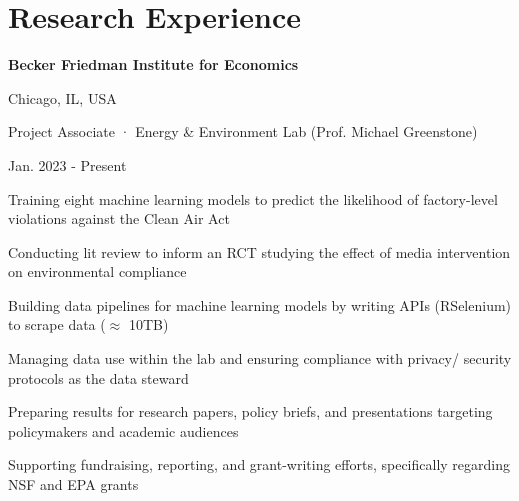 \documentclass[a4paper,20pt]{article}
\begin{document}
\vspace{0pt}
\section{Research Experience}
    \begin{minipage}{.75\linewidth} \begin{flushleft}
    		\textbf{Becker Friedman Institute for Economics}
    	\end{flushleft} \end{minipage}
    \hfill 
    \begin{minipage}{.20\linewidth}\begin{flushright}
    	 Chicago, IL, USA
    	\end{flushright}\end{minipage}
     
    \begin{minipage}{.75\linewidth} \begin{flushleft}
    		Project Associate · Energy \& Environment Lab (Prof. Michael Greenstone)
    	\end{flushleft} \end{minipage}
    \hfill 
    \begin{minipage}{.20\linewidth}\begin{flushright}
    	 Jan. 2023 - Present
    	\end{flushright}\end{minipage}
        \vspace{-5pt}
	\begin{description}[font=$\bullet$]
	\item{Training eight machine learning models to predict the likelihood of factory-level violations against the Clean Air Act}
        \vspace{-7pt}
        \item{Conducting lit review to inform an RCT studying the effect of media intervention on environmental compliance}
        \vspace{-7pt}
        \item{Building data pipelines for machine learning models by writing APIs (RSelenium) to scrape data ($\approx$ 10TB)} 
        \vspace{-7pt}
        \item{Managing data use within the lab and ensuring compliance with privacy/ security protocols as the data steward}
        \vspace{-7pt}
        \item{Preparing results for research papers, policy briefs, and presentations targeting policymakers and academic audiences}
        \vspace{-7pt}
        \item{Supporting fundraising, reporting, and grant-writing efforts, specifically regarding NSF and EPA grants}
\end{description}
\end{document}
